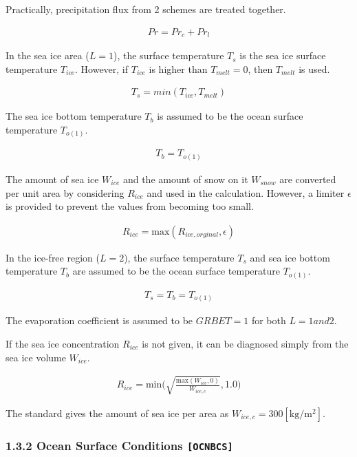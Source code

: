 Practically, precipitation flux from 2 schemes are treated together.

\begin{eqnarray}
    Pr = Pr_c + Pr_l
\end{eqnarray}

In the sea ice area (\(L=1\)), the surface temperature \(T_s\) is the
sea ice surface temperature \(T_{ice}\). However, if \(T_{ice}\) is
higher than \(T_{melt}=0\), then \(T_{melt}\) is used.

\begin{eqnarray}
    T_s = min(T_{ice},T_{melt})
\end{eqnarray}

The sea ice bottom temperature \(T_b\) is assumed to be the ocean
surface temperature \(T_{o(1)}\).

\begin{eqnarray}
    T_b = T_{o(1)}
\end{eqnarray}

The amount of sea ice \(W_{ice}\) and the amount of snow on it
\(W_{snow}\) are converted per unit area by considering \(R_{ice}\) and
used in the calculation. However, a limiter \(\epsilon\) is provided to
prevent the values from becoming too small.

\begin{eqnarray}
R_{ice} =\mathrm{max}( R_{ice,orginal}, \epsilon)
\end{eqnarray}

In the ice-free region (\(L=2\)), the surface temperature \(T_s\) and
sea ice bottom temperature \(T_b\) are assumed to be the ocean surface
temperature \(T_{o(1)}\).

\begin{eqnarray}
    T_s = T_b = T_{o(1)}
\end{eqnarray}

The evaporation coefficient is assumed to be \(GRBET=1\) for both
\(L=1 and 2\).

If the sea ice concentration \(R_{ice}\) is not given, it can be
diagnosed simply from the sea ice volume \(W_{ice}\).

\begin{eqnarray}
R_{ice} = \mathrm{min}\Big(\sqrt{\frac{\mathrm{max}(W_{ice},0)}{W_{ice,c}}},1.0\Big)
\end{eqnarray}

The standard gives the amount of sea ice per area as
\(W_{ice,c}=300 \mathrm{[kg/m^2]}\).

\hypertarget{ocean-surface-conditions-ocnbcs}{%
\subsubsection{\texorpdfstring{1.3.2 Ocean Surface Conditions
\texttt{{[}OCNBCS{]}}}{1.3.2 Ocean Surface Conditions {[}OCNBCS{]}}}\label{ocean-surface-conditions-ocnbcs}}

